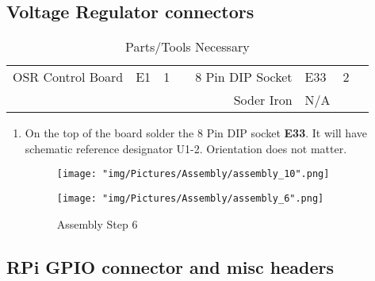 \documentclass[12pt]{article}
\begin{document}
\subsection{Voltage Regulator connectors}
\begin{table}[H]
    \centering
    \sffamily\footnotesize
    \caption{Parts/Tools Necessary}
    \begin{tabular}{|N|Q|Q|I|N|Q|Q|I|}
        \hline
         &  &  &  &  &  &  &  \\ \hline
        OSR Control Board & E1 & 1 &  & 8 Pin DIP Socket & E33 & 2 &  \\ \hline
         & & & & Soder Iron & N/A & &  \\ \hline
    \end{tabular}
\end{table}

\begin{enumerate}

\item On the top of the board solder the 8 Pin DIP socket \textbf{E33}. It will have schematic reference designator U1-2. Orientation does not matter. 

\begin{figure}[H]
  \centering
  \begin{minipage}[b]{0.45\textwidth}
    \texttt{[image: "img/Pictures/Assembly/assembly\_10".png]}
  \end{minipage}
  \hfill
  \begin{minipage}[b]{0.45\textwidth}
    \texttt{[image: "img/Pictures/Assembly/assembly\_6".png]}
  \end{minipage}
  \caption{Assembly Step 6}
  \label{assem_6}
\end{figure}


\end{enumerate}

\subsection{RPi GPIO connector and misc headers}
\end{document}
